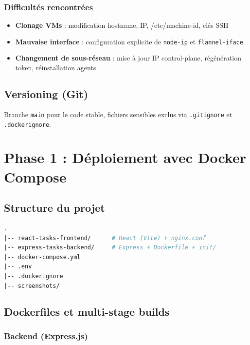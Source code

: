\documentclass[12pt,a4paper]{report}
\begin{document}
\subsection{Difficultés rencontrées}
\begin{itemize}
\item \textbf{Clonage VMs} : modification hostname, IP, /etc/machine-id, clés SSH
\item \textbf{Mauvaise interface} : configuration explicite de \texttt{node-ip} et \texttt{flannel-iface}
\item \textbf{Changement de sous-réseau} : mise à jour IP control-plane, régénération token, réinstallation agents
\end{itemize}

\section{Versioning (Git)}
Branche \texttt{main} pour le code stable, fichiers sensibles exclus via \texttt{.gitignore} et \texttt{.dockerignore}.

\chapter{Phase 1 : Déploiement avec Docker Compose}

\section{Structure du projet}

\begin{lstlisting}[language=bash]
.
|-- react-tasks-frontend/      # React (Vite) + nginx.conf
|-- express-tasks-backend/     # Express + Dockerfile + init/
|-- docker-compose.yml
|-- .env
|-- .dockerignore
|-- screenshots/
\end{lstlisting}

\section{Dockerfiles et multi-stage builds}

\subsection{Backend (Express.js)}
\end{document}
